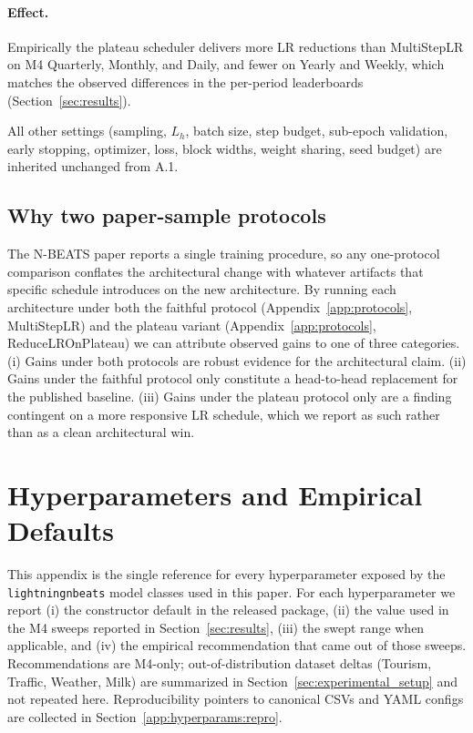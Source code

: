 \documentclass{article}
\begin{document}
\paragraph{Effect.} Empirically the plateau scheduler delivers more LR reductions than MultiStepLR on M4 Quarterly, Monthly, and Daily, and fewer on Yearly and Weekly, which matches the observed differences in the per-period leaderboards (Section~\ref{sec:results}).

All other settings (sampling, $L_h$, batch size, step budget, sub-epoch validation, early stopping, optimizer, loss, block widths, weight sharing, seed budget) are inherited unchanged from A.1.

\subsection{Why two paper-sample protocols}

The N-BEATS paper reports a single training procedure, so any one-protocol comparison conflates the architectural change with whatever artifacts that specific schedule introduces on the new architecture. By running each architecture under both the faithful protocol (Appendix~\ref{app:protocols}, MultiStepLR) and the plateau variant (Appendix~\ref{app:protocols}, ReduceLROnPlateau) we can attribute observed gains to one of three categories. (i) Gains under both protocols are robust evidence for the architectural claim. (ii) Gains under the faithful protocol only constitute a head-to-head replacement for the published baseline. (iii) Gains under the plateau protocol only are a finding contingent on a more responsive LR schedule, which we report as such rather than as a clean architectural win.


\section{Hyperparameters and Empirical Defaults}
\label{app:hyperparams}

This appendix is the single reference for every hyperparameter exposed by the \texttt{lightningnbeats} model classes used in this paper. For each hyperparameter we report (i) the constructor default in the released package, (ii) the value used in the M4 sweeps reported in Section~\ref{sec:results}, (iii) the swept range when applicable, and (iv) the empirical recommendation that came out of those sweeps. Recommendations are M4-only; out-of-distribution dataset deltas (Tourism, Traffic, Weather, Milk) are summarized in Section~\ref{sec:experimental_setup} and not repeated here. Reproducibility pointers to canonical CSVs and YAML configs are collected in Section~\ref{app:hyperparams:repro}.
\end{document}
